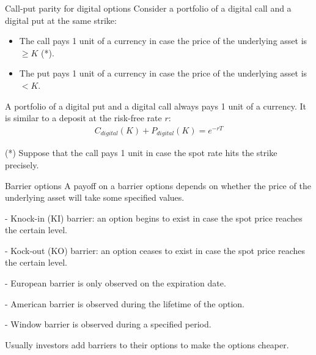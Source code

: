\documentclass{beamer}
\begin{document}
\begin{frame}{Call-put parity for digital options}
\justify
Consider a portfolio of a digital call and a digital put at the same strike:

\justify
\begin{itemize}
\justifying
\item The call pays 1 unit of a currency in case the price of the underlying asset is $\ge K$ (*).
\item The put pays 1 unit of a currency in case the price of the underlying asset is $< K$.
\end{itemize}

\justify
A portfolio of a digital put and a digital call always pays 1 unit of a currency. It is similar to a deposit at the risk-free rate $r$:
\begin{align*}
C_{digital}(K) + P_{digital}(K) = e^{-rT}
\end{align*}

\justify
(*) Suppose that the call pays 1 unit in case the spot rate hits the strike precisely.
\end{frame}



\begin{frame}{Barrier options}
\justify
A payoff on a \alert{barrier options} depends on whether the price of the underlying asset will take some specified values.

\justify
- \alert{Knock-in (KI)} barrier: an option begins to exist in case the spot price reaches the certain level.

- \alert{Kock-out (KO)} barrier: an option ceases to exist in case the spot price reaches the certain level.

\justify
- European barrier is only observed on the expiration date.

- American barrier is observed during the lifetime of the option.

- Window barrier is observed during a specified period.

\justify
Usually investors add barriers to their options to make the options cheaper.
\end{frame}
\end{document}
